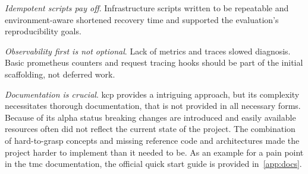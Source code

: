 \documentclass[11pt, a4paper, oneside, listof=totoc]{scrartcl}
\begin{document}
\begin{enumerate}[label={[\arabic*]:},
                ref=Challenge~\arabic*,
                leftmargin=*,
                itemsep=0.6\baselineskip]
                \item\label{chal:evalLessonsIdempotentScripts}
                    \textit{Idempotent scripts pay off}.
                    Infrastructure scripts written to be repeatable and environment-aware shortened
                    recovery time and supported the evaluation's reproducibility goals.
                
                \item\label{chal:evalLessonsObservabilityFirst}
                    \textit{Observability first is not optional}.
                    Lack of metrics and traces slowed diagnosis.
                    Basic \gls{prometheus} counters and request tracing hooks should be part of the
                    initial scaffolding, not deferred work.

                \item\label{chal:evalLessonsDocumentation}
                    \textit{Documentation is crucial}.
                    \gls{kcp} provides a intriguing approach, but its complexity necessitates
                    thorough documentation, that is not provided in all necessary forms.
                    Because of its alpha status breaking changes are introduced and easily available
                    resources often did not reflect the current state of the project.
                    The combination of hard-to-grasp concepts and missing reference code and
                    architectures made the project harder to implement than it needed to be.
                    As an example for a pain point in the \gls{tmc} documentation, the official
                    quick start guide is provided in~\autoref{app:docs}.
            \end{enumerate}

        
\end{document}
